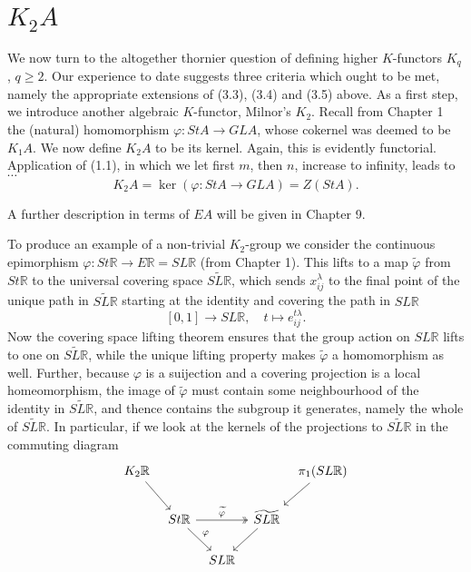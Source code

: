 \documentclass[openany,leqno]{book}  %
\newcommand{\R}{\mathbb{R}}
\begin{document}
\section*{$K_2A$}
We now turn to the altogether thornier question of defining higher $K$-functors $K_q$, $q \geqslant 2$. Our experience to date suggests three criteria which ought to be met, namely the appropriate extensions of (3.3), (3.4) and (3.5) above. As a first step, we introduce another algebraic $K$-functor, Milnor's $K_2$. Recall from Chapter 1 the (natural) homomorphism $\varphi\colon   StA \longrightarrow GLA$, whose cokernel was deemed to be $K_1A$. We now define $K_2 A$ to be its kernel. Again, this is evidently functorial. Application of (1.1), in which we let first $m$, then $n$, increase to infinity, leads to $\cdots$
\begin{equation}
  K_2A =\ker (\varphi\colon  StA\longrightarrow GLA) = Z(StA).
\end{equation}

A further description in terms of $EA$ will be given in Chapter 9. 

To produce an example of a non-trivial $K_2$-group we consider the continuous epimorphism  $\varphi\colon  St\R \longrightarrow E\R = SL\R$ (from Chapter 1). This lifts to a map $\widetilde{\varphi}$ from $St \R$ to the universal covering space $\widetilde{SL \R}$, which sends $x_{ij}^\lambda$ to the final point of the unique path in $\widetilde{SL \R}$ starting at the identity and covering the path in $SL\R$
\[[0, 1] \longrightarrow SL\R, \quad t\mapsto e_{ij}^{t\lambda} .\]
Now the covering space lifting theorem ensures that the group action on $SL\R$ lifts to one on $\widetilde{SL \R}$, while the unique lifting property makes $\widetilde{\varphi}$ a homomorphism as well. Further, because $\varphi$ is a suijection and a covering projection is a local homeomorphism, the image of $\widetilde{\varphi}$ must contain some neighbourhood of the identity in $\widetilde{SL \R}$, and thence contains the subgroup it generates,
namely the whole of $\widetilde{SL \R}$. In particular, if we look at the kernels of the projections to $\widetilde{SL \R}$ in the commuting diagram
\[
\begin{tikzcd}[column sep=tiny]
K_2\R \arrow{rd} & & & & \pi_1(SL \R) \arrow{dl}\\
 & St\R \arrow{rd}{\varphi} \arrow[two heads]{rr}{\widetilde{\varphi}} & & \widetilde{SL\R} \arrow{dl} & \\
 & & SL\R & &\\
\end{tikzcd}
\]
\end{document}
